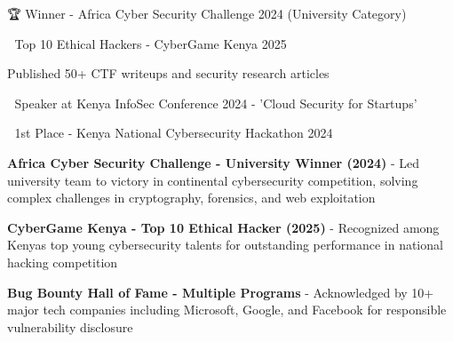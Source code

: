 \documentclass[]{resume-format}
\begin{document}
\vspace{0.5mm}
\begin{cvachievements}
\setlength{\itemsep}{0mm}
  \item { 🏆 Winner - Africa Cyber Security Challenge 2024 (University Category) \href{ https://cybersecuritychallenge.africa/winners-2024 }{\scriptsize\color{lightgray}\faLink} }
  \item { 🎯 Top 10 Ethical Hackers - CyberGame Kenya 2025 \href{ https://www.kenyanews.go.ke/kenya-fetes-young-cybersecurity-stars/ }{\scriptsize\color{lightgray}\faLink} }
  \item {  Published 50+ CTF writeups and security research articles \href{ https://medium.com/@danielwambua/security-research }{\scriptsize\color{lightgray}\faLink} }
  \item { 🎤 Speaker at Kenya InfoSec Conference 2024 - 'Cloud Security for Startups' \href{ https://infosecke.com/speakers/daniel-wambua }{\scriptsize\color{lightgray}\faLink} }
  \item { 🥇 1st Place - Kenya National Cybersecurity Hackathon 2024 \href{ https://hackathon.cybersecurity.go.ke/winners }{\scriptsize\color{lightgray}\faLink} }
\end{cvachievements}



\vspace{0.5mm}
\begin{cvachievements}
\setlength{\itemsep}{0mm}
  \item { \textbf{ Africa Cyber Security Challenge - University Winner (2024) } - Led university team to victory in continental cybersecurity competition, solving complex challenges in cryptography, forensics, and web exploitation \href{ https://cybersecuritychallenge.africa/winners-2024 }{\scriptsize\color{lightgray}\faLink} }
  \item { \textbf{ CyberGame Kenya - Top 10 Ethical Hacker (2025) } - Recognized among Kenya\textquotesingle{}s top young cybersecurity talents for outstanding performance in national hacking competition \href{ https://www.kenyanews.go.ke/kenya-fetes-young-cybersecurity-stars/ }{\scriptsize\color{lightgray}\faLink} }
  \item { \textbf{ Bug Bounty Hall of Fame - Multiple Programs } - Acknowledged by 10+ major tech companies including Microsoft, Google, and Facebook for responsible vulnerability disclosure \href{ https://bugcrowd.com/daniel-wambua }{\scriptsize\color{lightgray}\faLink} }
\end{cvachievements}
\end{document}
